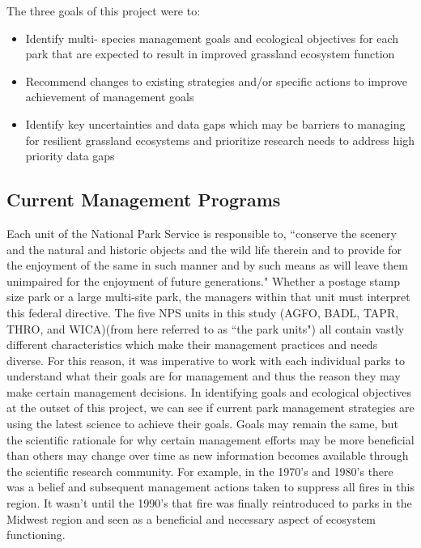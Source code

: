 The three goals of this project were to: 
\begin{itemize}
	\item {Identify multi- species management goals and ecological objectives for each park that are expected to result in improved grassland ecosystem function}
	\item {Recommend changes to existing strategies and/or specific actions to improve achievement of management goals}
	\item {Identify key uncertainties and data gaps which may be barriers to managing for resilient grassland ecosystems and prioritize research needs to address high priority data gaps}
\end{itemize}
\subsection*{Current Management Programs}
Each unit of the National Park Service is responsible to, ``conserve the scenery and the natural and historic objects and the wild life therein and to provide for the enjoyment of the same in such manner and by such means as will leave them unimpaired for the enjoyment of future generations." Whether a postage stamp size park or a large multi-site park, the managers within that unit must interpret this federal directive. The five NPS units in this study (AGFO, BADL, TAPR, THRO, and WICA)(from here referred to as ``the park units") all contain vastly different characteristics which make their management practices and needs diverse. For this reason, it was imperative to work with each individual parks to understand what their goals are for management and thus the reason they may make certain management decisions. 
In identifying goals and ecological objectives at the outset of this project, we can see if current park management strategies are using the latest science to achieve their goals. Goals may remain the same, but the scientific rationale for why certain management efforts may be more beneficial than others may change over time as new information becomes available through the scientific research community. For example, in the 1970’s and 1980’s there was a belief and subsequent management actions taken to suppress all fires in this region. It wasn’t until the 1990’s that fire was finally reintroduced to parks in the Midwest region and seen as a beneficial and necessary aspect of ecosystem functioning. 
